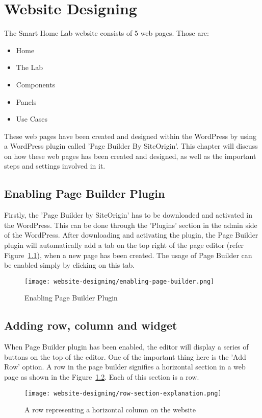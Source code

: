 \chapter{Website Designing}
The Smart Home Lab website consists of 5 web pages. Those are:
\begin{itemize}
\item Home
\item The Lab
\item Components
\item Panels
\item Use Cases
\end{itemize}

These web pages have been created and designed within the WordPress by using a WordPress plugin called 'Page Builder By SiteOrigin'. This chapter will discuss on how these web pages has been created and designed, as well as the important steps and settings involved in it.

\section{Enabling Page Builder Plugin}
Firstly, the 'Page Builder by SiteOrigin' has to be downloaded and activated in the WordPress. This can be done through the 'Plugins' section in the admin side of the WordPress. After downloading and activating the plugin, the Page Builder plugin will automatically add a tab on the top right of the page editor (refer Figure~\ref{enabling-page-builder}), when a new page has been created. The usage of Page Builder can be enabled simply by clicking on this tab.

\begin{figure}[h]
\centering
\caption{Enabling Page Builder Plugin}
\label{enabling-page-builder}
\texttt{[image: website-designing/enabling-page-builder.png]}
\end{figure}

\section{Adding row, column and widget}
When Page Builder plugin has been enabled, the editor will display a series of buttons on the top of the editor. One of the important thing here is the 'Add Row' option. A row in the page builder signifies a horizontal section in a web page as shown in the Figure~\ref{row-section-explanation}. Each of this section is a row.

\begin{figure}[h]
\centering
\caption{A row representing a horizontal column on the website}
\label{row-section-explanation}
\texttt{[image: website-designing/row-section-explanation.png]}
\end{figure}


